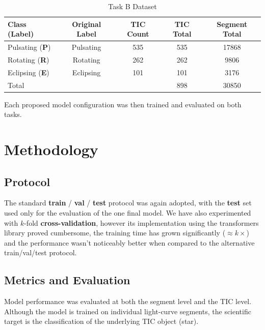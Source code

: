 \begin{table}[H]
    \scriptsize
    \centering
    \renewcommand{\arraystretch}{1.3}
    \begin{tabularx}{\textwidth}{Xcccc}
        \toprule
        \textbf{Class (Label)}           & \textbf{Original Label}    & \textbf{TIC Count} & \textbf{TIC Total} & \textbf{Segment Total}       \tabularnewline \midrule
        Pulsating (\textbf{P})   & Pulsating         & 535   & 535    & \num{17868}          \tabularnewline
        Rotating (\textbf{R})    & Rotating          & 262   & 262    & \num{9806}          \tabularnewline
        Eclipsing (\textbf{E})   & Eclipsing         & 101   & 101    & \num{3176}                 \tabularnewline \midrule
        Total           & & & 898       & \num{30850}          \tabularnewline
        \bottomrule
    \end{tabularx}
    \caption[Task B Dataset]{Task B Dataset}
    \label{tab:06_task_b_data}
\end{table}

\FloatBarrier

Each proposed model configuration was then trained and evaluated on both tasks.


\section{Methodology}

\subsection{Protocol}

The standard \textbf{train} / \textbf{val} / \textbf{test} protocol was again adopted, with the \textbf{test} set used only for the evaluation of the one final model.
We have also experimented with $k$-fold \textbf{cross-validation}, however its implementation using the transformers library proved cumbersome, the training time has grown significantly ($\approx k\times$) and the performance wasn't noticeably better when compared to the alternative train/val/test protocol.

\subsection{Metrics and Evaluation}

Model performance was evaluated at both the segment level and the TIC level.
Although the model is trained on individual light-curve segments, the scientific target is the classification of the underlying TIC object (star).


